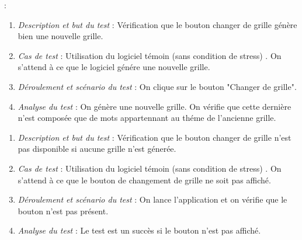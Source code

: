 \documentclass [ 11 pt ] {article}
\begin{document}
 : 
\begin{tcolorbox}[colback=positifC]
            \begin{enumerate}
                \item \textit{Description et but du test }: Vérification que le bouton changer de grille génère bien une nouvelle grille.
                
                \item \textit{Cas de test }: Utilisation du logiciel témoin (sans condition de stress) . On s'attend à ce que le logiciel génére une nouvelle grille.
                
                
                \item \textit{Déroulement et scénario du test }: On clique sur le bouton "Changer de grille".
                
                \item \textit{Analyse du test }: On génère une nouvelle grille. On vérifie que cette dernière n'est composée que de mots appartennant au théme de l'ancienne grille. 

            \end{enumerate}
        \end{tcolorbox}
        \begin{tcolorbox}[colback=negatifC]
            \begin{enumerate}
                \item \textit{Description et but du test }: Vérification que le bouton changer de grille n'est pas disponible si aucune grille n'est génerée.
                
                \item \textit{Cas de test }: Utilisation du logiciel témoin (sans condition de stress) . On s'attend à ce que le bouton de changement de grille ne soit pas affiché.
                
                
                \item \textit{Déroulement et scénario du test }: On lance l'application et on vérifie que le bouton n'est pas présent.
                
                \item \textit{Analyse du test }: Le test est un succès si le bouton n'est pas affiché.

            \end{enumerate}
        \end{tcolorbox}
\end{document}
